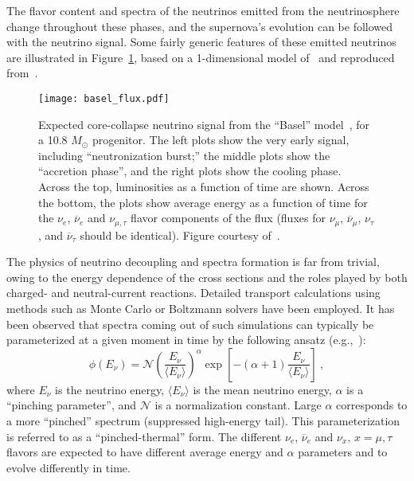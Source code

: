 The flavor content and spectra of the neutrinos emitted from the neutrinosphere change
throughout these phases, and the supernova's evolution can
be followed with the neutrino signal. %
Some fairly generic features of these emitted neutrinos are illustrated in Figure~\ref{fig:spectrum}, based on a 1-dimensional model of~\cite{Fischer:2009af} and reproduced from~\cite{Wurm:2011zn}.
%
\begin{figure}[!htb]
\centering
\texttt{[image: basel\_flux.pdf]}
\caption[Expected core-collapse neutrino signal]{Expected
  core-collapse neutrino signal from the ``Basel''
  model~\cite{Fischer:2009af}, for a
  10.8 $M_{\odot}$ progenitor.  The left plots show the very early
  signal, including ``neutronization burst;'' the middle plots show
  the ``accretion phase'', and the right plots show the cooling
  phase. Across the top, luminosities as a function of time are shown. 
  Across the bottom, the plots show average energy as a function of time for the
  $\nu_e$, $\overline{\nu}_e$ and $\nu_{\mu,\tau}$ flavor components of the
  flux (fluxes for $\nu_\mu$, $\overline{\nu}_\mu$, $\nu_\tau$,
  and $\overline{\nu}_\tau$ should be identical).  Figure courtesy of~\cite{Wurm:2011zn}.}
\label{fig:spectrum}
\end{figure}

The physics of neutrino decoupling and spectra formation is far from trivial, owing to the energy dependence of the cross sections and the roles played by both charged- and neutral-current reactions.
Detailed transport calculations using methods such as Monte Carlo or Boltzmann solvers have been employed. It has been observed that spectra coming out of such simulations can typically be parameterized at a given moment in time by the following ansatz (e.g.,~\cite{Minakata:2008nc,Tamborra:2012ac}):
\begin{equation}
        \label{eq:pinched}
        \phi(E_{\nu}) = \mathcal{N} 
        \left(\frac{E_{\nu}}{\langle E_{\nu} \rangle}\right)^{\alpha} \exp\left[-\left(\alpha + 1\right)\frac{E_{\nu}}{\langle E_{\nu} \rangle}\right] \ ,
\end{equation}
where $E_{\nu}$ is the neutrino energy, $\langle E_\nu \rangle$ is the
mean neutrino energy, $\alpha$ is a ``pinching parameter'', and
$\mathcal{N}$ is a normalization constant.
%
Large $\alpha$ corresponds to a more ``pinched'' spectrum (suppressed
high-energy tail). This parameterization is referred to as a
``pinched-thermal'' form. The different $\nu_e$, $\overline{\nu}_e$ and
$\nu_x, \, x = \mu, \tau$ flavors are expected to have different
average energy and $\alpha$ parameters and to evolve differently in
time. 

